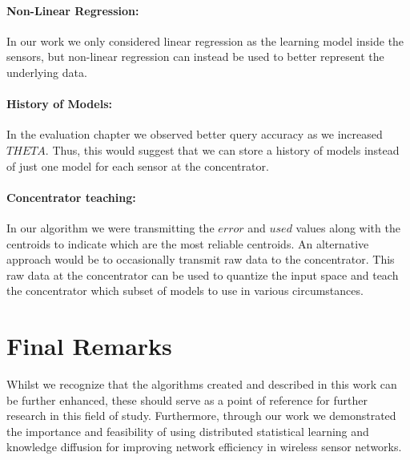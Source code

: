 \documentclass{mproj}
\begin{document}
\paragraph{Non-Linear Regression:}In our work we only considered linear regression as the learning model inside the sensors, but non-linear regression can instead be used to better represent the underlying data. 
\paragraph{History of Models:}In the evaluation chapter we observed better query accuracy as we increased $THETA$. Thus, this would suggest that we can store a history of models instead of just one model for each sensor at the concentrator.
\paragraph{Concentrator teaching:}In our algorithm we were transmitting the $error$ and $used$ values along with the centroids to indicate which are the most reliable centroids. An alternative approach would be to occasionally transmit raw data to the concentrator. This raw data at the concentrator can be used to quantize the input space and teach the concentrator which subset of models to use in various circumstances.

\section{Final Remarks}
Whilst we recognize that the algorithms created and described in this work can be further enhanced, these should serve as a point of reference for further research in this field of study. Furthermore, through our work we demonstrated the importance and feasibility of using distributed statistical learning and knowledge diffusion for improving network efficiency in wireless sensor networks.



\end{document}
